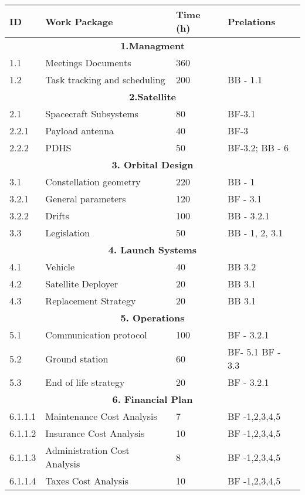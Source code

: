 \begin{longtable}{ | p{1.3cm} | p{7cm} | p{3cm} | p{3.5cm} |}
\hline

\textbf{ID }& \textbf{Work Package} & \textbf{Time (h)} & \textbf{Prelations} \\ \hline
\multicolumn{4}{|c|}{\textbf{1.Managment}} \\ \hline
1.1 & Meetings Documents & 360 &   \\ \hline
1.2 & Task tracking and scheduling & 200 & BB - 1.1 \\ \hline
\multicolumn{4}{|c|}{\textbf{2.Satellite}} \\ \hline
2.1 & Spacecraft Subsystems & 80 & BF-3.1 \\ \hline
2.2.1 & Payload antenna & 40 & BF-3 \\ \hline
2.2.2 & PDHS & 50 & BF-3.2; BB - 6 \\ \hline
\multicolumn{4}{|c|}{\textbf{3. Orbital Design}} \\ \hline
3.1 & Constellation geometry & 220 & BB - 1 \\ \hline
3.2.1 & General parameters & 120 & BF - 3.1 \\ \hline
3.2.2 & Drifts & 100 & BB - 3.2.1 \\ \hline
3.3 & Legislation & 50 & BB - 1, 2, 3.1\\ \hline
\multicolumn{4}{|c|}{\textbf{4. Launch Systems}} \\ \hline
4.1 & Vehicle & 40 & BB 3.2 \\ \hline
4.2 & Satellite Deployer & 20 & BB 3.1  \\ \hline
4.3 & Replacement Strategy & 20 & BB 3.1  \\ \hline
\multicolumn{4}{|c|}{\textbf{5. Operations}} \\ \hline
5.1 & Communication protocol & 100 & BF - 3.2.1 \\ \hline
5.2 & Ground station & 60 & BF- 5.1 \newline BF - 3.3 \\ \hline
5.3 & End of life strategy & 20 & BF - 3.2.1 \\
\hline
\multicolumn{4}{|c|}{\textbf{6. Financial Plan}} \\ \hline
6.1.1.1 & Maintenance Cost Analysis & 7 & BF -1,2,3,4,5 \\ \hline
6.1.1.2 & Insurance Cost Analysis & 10 & BF -1,2,3,4,5  \\ \hline
6.1.1.3 & Administration Cost Analysis & 8 & BF -1,2,3,4,5 \\ \hline
6.1.1.4 & Taxes Cost Analysis  & 10 & BF -1,2,3,4,5  \\ \hline

\end{longtable}
